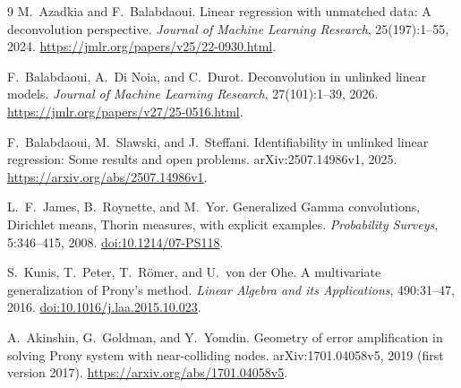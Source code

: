 \documentclass[11pt]{article}
\theoremstyle{definition}\newtheorem{definition}[theorem]{Definition}
\theoremstyle{remark}\newtheorem{remark}[theorem]{Remark}
\begin{document}
\begin{thebibliography}{9}
M.~Azadkia and F.~Balabdaoui.
\newblock Linear regression with unmatched data: A deconvolution perspective.
\newblock \emph{Journal of Machine Learning Research}, 25(197):1--55, 2024.
\newblock \url{https://jmlr.org/papers/v25/22-0930.html}.

F.~Balabdaoui, A.~Di Noia, and C.~Durot.
\newblock Deconvolution in unlinked linear models.
\newblock \emph{Journal of Machine Learning Research}, 27(101):1--39, 2026.
\newblock \url{https://jmlr.org/papers/v27/25-0516.html}.

F.~Balabdaoui, M.~Slawski, and J.~Steffani.
\newblock Identifiability in unlinked linear regression: Some results and open problems.
\newblock arXiv:2507.14986v1, 2025.
\newblock \url{https://arxiv.org/abs/2507.14986v1}.

L.~F.~James, B.~Roynette, and M.~Yor.
\newblock Generalized Gamma convolutions, Dirichlet means, Thorin measures, with explicit examples.
\newblock \emph{Probability Surveys}, 5:346--415, 2008.
\newblock \href{https://doi.org/10.1214/07-PS118}{doi:10.1214/07-PS118}.

S.~Kunis, T.~Peter, T.~R\"omer, and U.~von der Ohe.
\newblock A multivariate generalization of Prony's method.
\newblock \emph{Linear Algebra and its Applications}, 490:31--47, 2016.
\newblock \href{https://doi.org/10.1016/j.laa.2015.10.023}{doi:10.1016/j.laa.2015.10.023}.

A.~Akinshin, G.~Goldman, and Y.~Yomdin.
\newblock Geometry of error amplification in solving Prony system with near-colliding nodes.
\newblock arXiv:1701.04058v5, 2019 (first version 2017).
\newblock \url{https://arxiv.org/abs/1701.04058v5}.
\end{thebibliography}
\end{document}
